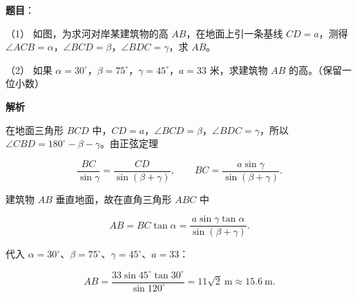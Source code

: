 \begin{answer}

\textbf{题目}：

（1） 如图，为求河对岸某建筑物的高 $AB$，在地面上引一条基线 $CD=a$，测得 $\angle ACB=\alpha$，$\angle BCD=\beta$，$\angle BDC=\gamma$，求 $AB$。
\nopagebreak[4]
\begin{center}\end{center}
\nopagebreak[4]
（2） 如果 $\alpha=30^\circ$，$\beta=75^\circ$，$\gamma=45^\circ$，$a=33$ 米，求建筑物 $AB$ 的高。（保留一位小数）

\textbf{解析}


在地面三角形 $BCD$ 中，$CD=a$，$\angle BCD=\beta$，$\angle BDC=\gamma$，所以 $\angle CBD=180^\circ-\beta-\gamma$。由正弦定理

\nopagebreak[4]
\[
\frac{BC}{\sin\gamma}=\frac{CD}{\sin(\beta+\gamma)},
\qquad
BC=\frac{a\sin\gamma}{\sin(\beta+\gamma)}.
\]

建筑物 $AB$ 垂直地面，故在直角三角形 $ABC$ 中

\nopagebreak[4]
\[
AB=BC\tan\alpha
=\frac{a\sin\gamma\tan\alpha}{\sin(\beta+\gamma)}.
\]


代入 $\alpha=30^\circ$、$\beta=75^\circ$、$\gamma=45^\circ$、$a=33$：

\nopagebreak[4]
\[
AB=\frac{33\sin45^\circ\tan30^\circ}{\sin120^\circ}
=11\sqrt2\ \mathrm m\approx15.6\ \mathrm m.
\]



\end{answer}
